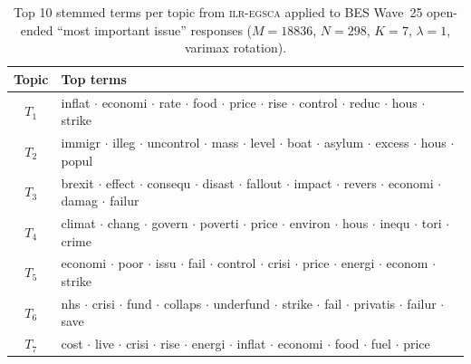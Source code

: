 \begin{table}[!ht]
\centering
\small
\caption{Top 10 stemmed terms per topic from \textsc{ilr-egsca} applied to
BES Wave~25 open-ended ``most important issue'' responses
($M=18836$, $N=298$, $K=7$, $\lambda=1$, varimax rotation).}
\label{tab:bes_topics}
\begin{tabular}{cl}
\toprule
Topic & Top terms \\
\midrule
$T_1$ & inflat $\cdot$ economi $\cdot$ rate $\cdot$ food $\cdot$ price $\cdot$ rise $\cdot$ control $\cdot$ reduc $\cdot$ hous $\cdot$ strike \\
$T_2$ & immigr $\cdot$ illeg $\cdot$ uncontrol $\cdot$ mass $\cdot$ level $\cdot$ boat $\cdot$ asylum $\cdot$ excess $\cdot$ hous $\cdot$ popul \\
$T_3$ & brexit $\cdot$ effect $\cdot$ consequ $\cdot$ disast $\cdot$ fallout $\cdot$ impact $\cdot$ revers $\cdot$ economi $\cdot$ damag $\cdot$ failur \\
$T_4$ & climat $\cdot$ chang $\cdot$ govern $\cdot$ poverti $\cdot$ price $\cdot$ environ $\cdot$ hous $\cdot$ inequ $\cdot$ tori $\cdot$ crime \\
$T_5$ & economi $\cdot$ poor $\cdot$ issu $\cdot$ fail $\cdot$ control $\cdot$ crisi $\cdot$ price $\cdot$ energi $\cdot$ econom $\cdot$ strike \\
$T_6$ & nhs $\cdot$ crisi $\cdot$ fund $\cdot$ collaps $\cdot$ underfund $\cdot$ strike $\cdot$ fail $\cdot$ privatis $\cdot$ failur $\cdot$ save \\
$T_7$ & cost $\cdot$ live $\cdot$ crisi $\cdot$ rise $\cdot$ energi $\cdot$ inflat $\cdot$ economi $\cdot$ food $\cdot$ fuel $\cdot$ price \\
\bottomrule
\end{tabular}
\end{table}

